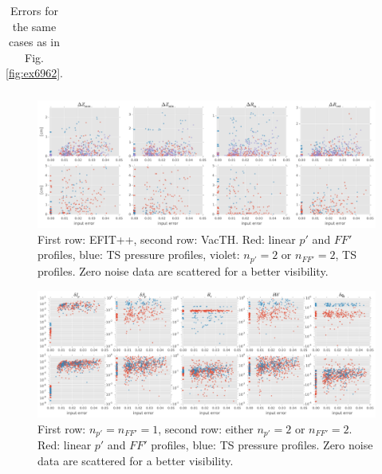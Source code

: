 \begin{table}
\begin{tabular}{lrrrrrrrrrrrrr}

\bottomrule
\end{tabular}
\caption{Errors for the same cases as in Fig. \ref{fig:ex6962}.}
\label{table:ex6962}
\end{table}


\begin{figure}
\centering   %
\hfill{}
\includegraphics[width=18cm]{figures/RZstats.pdf}
\hfill{}
\caption{First row: EFIT++, second row: VacTH. Red: linear $p'$ and $FF'$ profiles, blue: TS pressure profiles, violet: $n_{p'}=2$ or $n_{FF'}=2$, TS profiles. Zero noise data are scattered for a better visibility.}
\label{fig:RZstats}
\end{figure}

\begin{figure}
\centering   %
\hfill{}
\includegraphics[width=18cm]{figures/kinetic_stats.pdf}
\hfill{}
\caption{First row: $n_{p'}=n_{FF'}=1$, second row: either $n_{p'}=2$ or $n_{FF'}=2$. Red: linear $p'$ and $FF'$ profiles, blue: TS pressure profiles. Zero noise data are scattered for a better visibility.}
\label{fig:kinetic_stats}
\end{figure}


